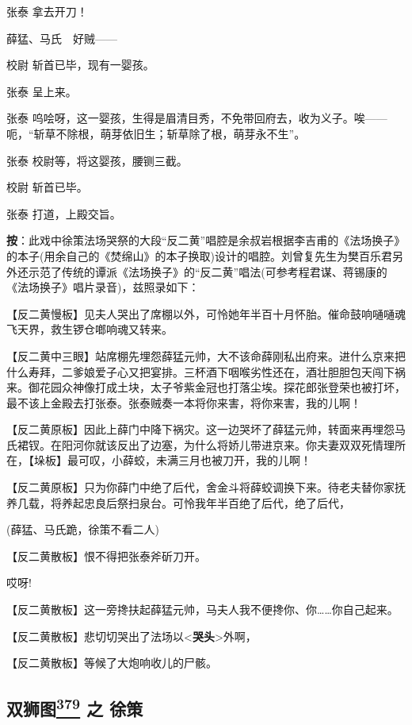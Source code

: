 张泰 拿去开刀！

薛猛、马氏　好贼------

校尉 斩首已毕，现有一婴孩。

张泰 呈上来。

张泰
呜哙呀，这一婴孩，生得是眉清目秀，不免带回府去，收为义子。唉------呃，``斩草不除根，萌芽依旧生；斩草除了根，萌芽永不生''。

张泰 校尉等，将这婴孩，腰铡三截。

校尉 斩首已毕。

张泰 打道，上殿交旨。

\textbf{按}：此戏中徐策法场哭祭的大段``反二黄''唱腔是余叔岩根据李吉甫的《法场换子》的本子(用余自己的《焚绵山》的本子换取)设计的唱腔。刘曾复先生为樊百乐君另外还示范了传统的谭派《法场换子》的``反二黄''唱法(可参考程君谋、蒋锡康的《法场换子》唱片录音)，兹照录如下：

【反二黄慢板】见夫人哭出了席棚以外，可怜她年半百十月怀胎。催命鼓响嗵嗵魂飞天界，救生锣仓啷响魂又转来。

【反二黄中三眼】站席棚先埋怨薛猛元帅，大不该命薛刚私出府来。进什么京来把什么寿拜，二爹娘爱子心又把宴排。三杯酒下咽喉劣性还在，酒壮胆胆包天闯下祸来。御花园众神像打成土块，太子爷紫金冠也打落尘埃。探花郎张登荣也被打坏，最不该上金殿去打张泰。张泰贼奏一本将你来害，将你来害，我的儿啊！

【反二黄原板】因此上薛门中降下祸灾。这一边哭坏了薛猛元帅，转面来再埋怨马氏裙钗。在阳河你就该反出了边塞，为什么将娇儿带进京来。你夫妻双双死情理所在，【垛板】最可叹，小薛蛟，未满三月也被刀开，我的儿啊！

【反二黄原板】只为你薛门中绝了后代，舍金斗将薛蛟调换下来。待老夫替你家抚养几载，将养起忠良后祭扫泉台。可怜我年半百绝了后代，绝了后代，

(薛猛、马氏跪，徐策不看二人)

【反二黄散板】恨不得把张泰斧斫刀开。

哎呀!

【反二黄散板】这一旁搀扶起薛猛元帅，马夫人我不便搀你、你\ldots{}\ldots{}你自己起来。

【反二黄散板】悲切切哭出了法场以\textless{}\textbf{哭头}\textgreater{}外啊，

【反二黄散板】等候了大炮响收儿的尸骸。

\hypertarget{ux53ccux72eeux56fe-ux4e4b-ux5f90ux7b56}{%
\subsection{\texorpdfstring{双狮图\protect\hyperlink{fn379}{\textsuperscript{379}}
之
徐策}{双狮图379 之 徐策}}\label{ux53ccux72eeux56fe-ux4e4b-ux5f90ux7b56}}

